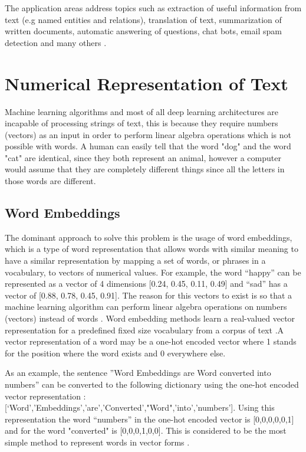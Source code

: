 The application areas address topics such as extraction of useful information from text (e.g named entities and relations), translation of text, summarization of written documents, automatic answering of questions, chat bots, email spam detection and many others \cite{Otter2018}.




\section{Numerical Representation of Text}
\label{sec:num}

\par Machine learning algorithms and most of all deep learning architectures are incapable of processing strings of text, this is because they require numbers (vectors) as an input in order to perform linear algebra operations \cite{Vidhya2017} which is not possible with words. A human can easily tell that the word "dog" and the word "cat" are identical, since they both represent an animal, however a computer would assume that they are completely different things since all the letters in those  words are different. 

    \subsection{Word Embeddings}

    \par The dominant approach to solve this problem is the usage of word embeddings, which is a type of word representation that allows words with similar meaning to have a similar representation by mapping a set of words, or phrases in a vocabulary, to vectors of numerical values. For example, the word “happy” can be represented as a vector of 4 dimensions [0.24, 0.45, 0.11, 0.49] and “sad” has a vector of [0.88, 0.78, 0.45, 0.91]. The reason for this vectors to exist is so that a machine learning algorithm can perform linear algebra operations on numbers (vectors) instead of words \cite{MuratMustafa}. Word embedding methods learn a real-valued vector representation for a predefined fixed size vocabulary from a corpus  of text \cite{Brownlee2017}.A vector representation of a word may be a one-hot encoded vector where 1 stands for the position where the word exists and 0 everywhere else. 
    
    \par As an example, the sentence ”Word Embeddings are Word converted into numbers” can be converted to the following dictionary using the one-hot encoded vector representation : [‘Word’,’Embeddings’,’are’,’Converted’,"Word",’into’,’numbers’]. Using this representation the word “numbers” in the one-hot encoded vector is [0,0,0,0,0,1] and for the word "converted" is [0,0,0,1,0,0]. This is considered to be the most simple method to represent words in vector forms \cite{Vidhya2017}.

